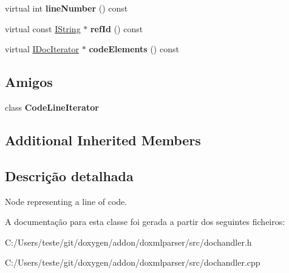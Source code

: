 \begin{DoxyCompactItemize}
\item 
\hypertarget{class_code_line_handler_a098a80d91a440a40f95fc5f99aa83bf3}{virtual int {\bfseries line\-Number} () const }\label{class_code_line_handler_a098a80d91a440a40f95fc5f99aa83bf3}

\item 
\hypertarget{class_code_line_handler_a2488ce15cc44de0c90c8f6116e9d5094}{virtual const \hyperlink{class_i_string}{I\-String} $\ast$ {\bfseries ref\-Id} () const }\label{class_code_line_handler_a2488ce15cc44de0c90c8f6116e9d5094}

\item 
\hypertarget{class_code_line_handler_ad94162a254e317a5e8331e7a15f8199f}{virtual \hyperlink{class_i_doc_iterator}{I\-Doc\-Iterator} $\ast$ {\bfseries code\-Elements} () const }\label{class_code_line_handler_ad94162a254e317a5e8331e7a15f8199f}

\end{DoxyCompactItemize}
\subsection*{Amigos}
\begin{DoxyCompactItemize}
\item 
\hypertarget{class_code_line_handler_a58edddfb3f15948fd8e3e8c67db55d01}{class {\bfseries Code\-Line\-Iterator}}\label{class_code_line_handler_a58edddfb3f15948fd8e3e8c67db55d01}

\end{DoxyCompactItemize}
\subsection*{Additional Inherited Members}


\subsection{Descrição detalhada}
Node representing a line of code. 



A documentação para esta classe foi gerada a partir dos seguintes ficheiros\-:\begin{DoxyCompactItemize}
\item 
C\-:/\-Users/teste/git/doxygen/addon/doxmlparser/src/dochandler.\-h\item 
C\-:/\-Users/teste/git/doxygen/addon/doxmlparser/src/dochandler.\-cpp\end{DoxyCompactItemize}
